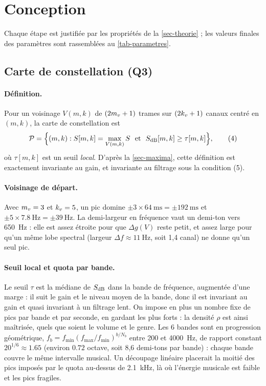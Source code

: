 \section{Conception}
\label{sec-conception}

Chaque étape est justifiée par les propriétés de la \cref{sec-theorie} ; les valeurs finales
des paramètres sont rassemblées au \cref{tab-parametres}.

\subsection{Carte de constellation (Q3)}
\label{sec-pics}

\paragraph{Définition.} Pour un voisinage $V(m,k)$ de $(2m_v+1)$ trames sur $(2k_v+1)$
canaux centré en $(m,k)$, la carte de constellation est
\begin{equation}
  \mathcal{P} = \Bigl\{ (m,k) : S[m,k] = \max_{V(m,k)} S \ \text{ et } \ S_{\mathrm{dB}}[m,k] \ge \tau[m,k] \Bigr\},
  \tag{4}
\end{equation}
où $\tau[m,k]$ est un seuil \emph{local}. D'après la \cref{sec-maxima}, cette définition est
exactement invariante au gain, et invariante au filtrage sous la condition (5).

\paragraph{Voisinage de départ.} Avec $m_v = 3$ et $k_v = 5$, un pic domine
$\pm 3 \times \qty{64}{\milli\second} = \pm\qty{192}{\milli\second}$ et
$\pm 5 \times \qty{7.8}{\hertz} = \pm\qty{39}{\hertz}$. La demi-largeur en fréquence vaut
un demi-ton vers \qty{650}{\hertz} : elle est assez étroite pour que $\Delta g(V)$
reste petit, et assez large pour qu'un même lobe spectral (largeur
$\Delta f \approx \qty{11}{\hertz}$, soit 1,4 canal) ne donne qu'un seul pic.

\paragraph{Seuil local et quota par bande.} Le seuil $\tau$ est la médiane de $S_{\mathrm{dB}}$ dans la
bande de fréquence, augmentée d'une marge : il suit le gain et le niveau moyen de la bande,
donc il est invariant au gain et quasi invariant à un filtrage lent. On impose en plus un
nombre fixe de pics par bande et par seconde, en gardant les plus forts : la densité $\rho$
est ainsi maîtrisée, quels que soient le volume et le genre. Les 6 bandes sont en
progression géométrique, $f_b = f_{\min}(f_{\max}/f_{\min})^{b/N_b}$ entre 200 et
\qty{4000}{\hertz}, de rapport constant $20^{1/6} \approx \num{1.65}$ (environ $\num{0.72}$
octave, soit 8,6 demi-tons par bande) : chaque bande couvre le même intervalle musical. Un
découpage linéaire placerait la moitié des pics imposés par le quota au-dessus de
\qty{2.1}{\kilo\hertz}, là où l'énergie musicale est faible et les pics fragiles.

